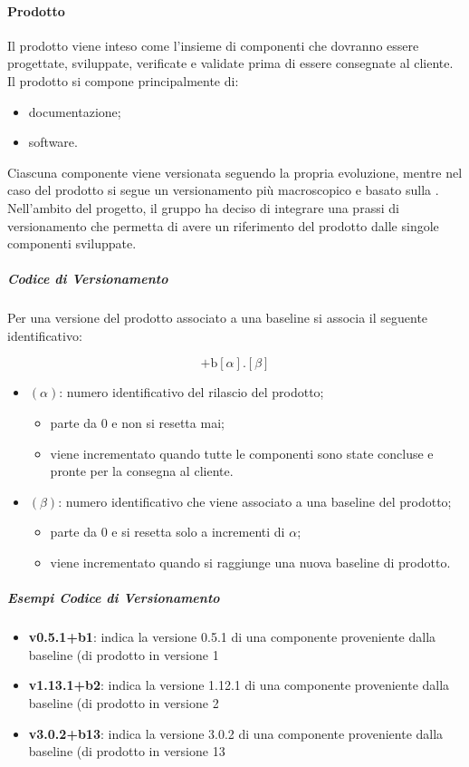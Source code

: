 	\paragraph{Prodotto}

	Il prodotto viene inteso come l'insieme di componenti che dovranno essere progettate, sviluppate, verificate e validate prima di essere consegnate al cliente. Il prodotto si compone principalmente di:
	\begin{itemize}
		\item documentazione;
		\item software.
	\end{itemize}

	Ciascuna componente viene versionata seguendo la propria evoluzione, mentre nel caso del prodotto si segue un versionamento più macroscopico e basato sulla .
	Nell'ambito del progetto, il gruppo ha deciso di integrare una prassi di versionamento che permetta di avere un riferimento del prodotto dalle singole componenti sviluppate.

		\subparagraph{Codice di Versionamento}

		Per una versione del prodotto associato a una baseline si associa il seguente identificativo:

		\[%
			\text{+b}[\alpha].[\beta]
		\]

		\begin{itemize}
			\item \((\alpha)\): numero identificativo del rilascio del prodotto;
			\begin{itemize}
				\item parte da 0 e non si resetta mai;
				\item viene incrementato quando tutte le componenti sono state concluse e pronte per la consegna al cliente.
			\end{itemize}
			\item \((\beta)\): numero identificativo che viene associato a una baseline del prodotto;
			\begin{itemize}
				\item parte da 0 e si resetta solo a incrementi di \(\alpha\);
				\item viene incrementato quando si raggiunge una nuova baseline di prodotto. 
			\end{itemize}
		\end{itemize}

		\subparagraph{Esempi Codice di Versionamento}

		\begin{itemize}
			\item \textbf{v0.5.1+b1}: indica la versione 0.5.1 di una componente proveniente dalla baseline (di prodotto in versione 1
			\item \textbf{v1.13.1+b2}:  indica la versione 1.12.1 di una componente proveniente dalla baseline (di prodotto in versione 2
			\item \textbf{v3.0.2+b13}: indica la versione 3.0.2 di una componente proveniente dalla baseline (di prodotto in versione 13
		\end{itemize}

